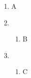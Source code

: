 \documentclass{article}
\begin{document}
\begin{enumerate}
  \item A
  \item
        \begin{enumerate}
           \item B
        \end{enumerate}
  \item
        \begin{enumerate}
          \item C
        \end{enumerate}
\end{enumerate}
\end{document}
